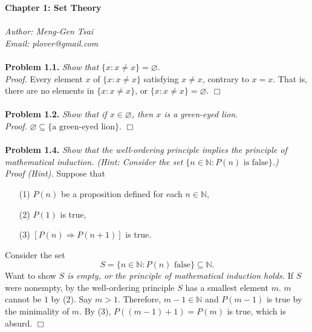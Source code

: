 \documentclass{article}
\begin{document}
\textbf{\Large Chapter 1: Set Theory} \\\\



\emph{Author: Meng-Gen Tsai} \\
\emph{Email: plover@gmail.com} \\\\



\textbf{Problem 1.1.}
\emph{Show that $\{ x : x \neq x \} = \varnothing$.} \\

\emph{Proof.}
Every element $x$ of $\{ x : x \neq x \}$ satisfying $x \neq x$,
contrary to $x = x$. That is, there are no elements in $\{ x : x \neq x \}$,
or $\{ x : x \neq x \} = \varnothing$.
$\Box$ \\\\



\textbf{Problem 1.2.}
\emph{Show that if $x \in \varnothing$, then $x$ is a green-eyed lion.} \\

\emph{Proof.}
$\varnothing \subseteq \{ \text{a green-eyed lion} \}$.
$\Box$ \\\\



\textbf{Problem 1.4.}
\emph{Show that the well-ordering principle implies
the principle of mathematical induction.
(Hint: Consider the set $\{ n \in \mathbb{N} : P(n) \text{ is false} \}$.)} \\

\emph{Proof (Hint).}
Suppose that
\begin{enumerate}
\item[(1)]
$P(n)$ be a proposition defined for each $n \in \mathbb{N}$,
\item[(2)]
$P(1)$ is true,
\item[(3)]
$[P(n) \Rightarrow P(n+1)]$ is true.
\end{enumerate}

Consider the set
$$S = \{ n \in \mathbb{N} : P(n) \text{ false} \} \subseteq \mathbb{N}.$$
Want to show
\emph{$S$ is empty, or the principle of mathematical induction holds.}
If $S$ were nonempty,
by the well-ordering principle $S$ has a smallest element $m$.
$m$ cannot be $1$ by (2).
Say $m > 1$.
Therefore, $m - 1 \in \mathbb{N}$
and $P(m-1)$ is true by the minimality of $m$.
By (3), $P((m-1)+1) = P(m)$ is true, which is absurd.
$\Box$ \\\\
\end{document}
